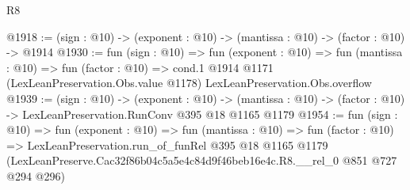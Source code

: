 \begin{lexlean}{R8}
\begin{coremodule}
@1918 := (sign : @10) -> (exponent : @10) -> (mantissa : @10) -> (factor : @10) -> @1914
@1930 := fun (sign : @10) =>
  fun (exponent : @10) =>
  fun (mantissa : @10) =>
  fun (factor : @10) =>
  cond.{1} @1914 @1171 (LexLeanPreservation.Obs.value @1178) LexLeanPreservation.Obs.overflow
@1939 := (sign : @10) ->
  (exponent : @10) ->
  (mantissa : @10) -> (factor : @10) -> LexLeanPreservation.RunConv @395 @18 @1165 @1179
@1954 := fun (sign : @10) =>
  fun (exponent : @10) =>
  fun (mantissa : @10) =>
  fun (factor : @10) =>
  LexLeanPreservation.run_of_funRel
    @395
    @18
    @1165
    @1179
    (LexLeanPreserve.Cac32f86b04c5a5e4c84d9f46beb16e4c.R8.__rel_0 @851 @727 @294 @296)
\end{coremodule}
\end{lexlean}
